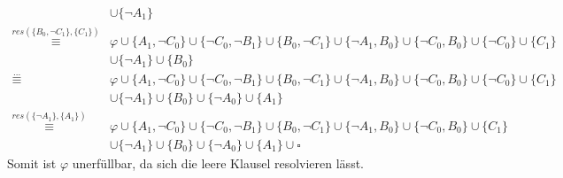 \documentclass[a4paper,10pt]{article}
\begin{document}
\begin{enumerate}
\begin{align*}
		&\cup \{ \neg A_1 \}\\
		\overset{res(\{ B_0, \neg C_1 \},\{C_1\})}{\equiv} &\varphi \cup \{ A_1,\neg C_0 \} \cup \{ \neg C_0, \neg B_1\} \cup \{ B_0, \neg C_1\} \cup \{\neg A_1, B_0\} \cup \{\neg C_0, B_0 \} \cup \{\neg C_0\} \cup \{C_1\} \\
		&\cup \{ \neg A_1 \} \cup \{ B_0 \}\\
		\overset{...}{\equiv} &\varphi \cup \{ A_1,\neg C_0 \} \cup \{ \neg C_0, \neg B_1\} \cup \{ B_0, \neg C_1\} \cup \{\neg A_1, B_0\} \cup \{\neg C_0, B_0 \} \cup \{\neg C_0\} \cup \{C_1\} \\
		&\cup \{ \neg A_1 \} \cup \{ B_0 \} \cup \{\neg A_0\} \cup \{A_1\} \\
		\overset{res(\{\neg A_1\},\{ A_1 \})}{\equiv} &\varphi \cup \{ A_1,\neg C_0 \} \cup \{ \neg C_0, \neg B_1\} \cup \{ B_0, \neg C_1\} \cup \{\neg A_1, B_0\} \cup \{\neg C_0, B_0 \} \cup \{C_1\} \\
		&\cup \{ \neg A_1 \} \cup \{ B_0 \} \cup \{\neg A_0\} \cup \{A_1\} \cup \square
	\end{align*}
	Somit ist $\varphi$ unerfüllbar, da sich die leere Klausel resolvieren lässt.

	\end{enumerate}
\end{document}
